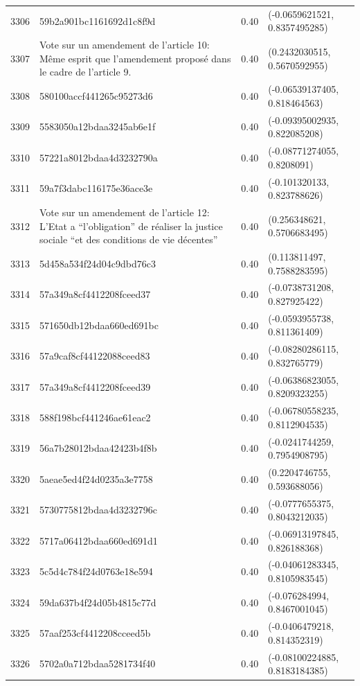 \begin{table}[ht]
\begin{tabular}{rlrl}
  3306 & 59b2a901bc1161692d1c8f9d & 0.40 & (-0.0659621521, 0.8357495285) \\ 
  3307 & Vote sur un amendement de l'article 10: Même esprit que l'amendement proposé dans le cadre de l'article 9. & 0.40 & (0.2432030515, 0.5670592955) \\ 
  3308 & 580100accf441265c95273d6 & 0.40 & (-0.06539137405, 0.818464563) \\ 
  3309 & 5583050a12bdaa3245ab6e1f & 0.40 & (-0.09395002935, 0.822085208) \\ 
  3310 & 57221a8012bdaa4d3232790a & 0.40 & (-0.08771274055, 0.8208091) \\ 
  3311 & 59a7f3dabc116175e36ace3e & 0.40 & (-0.101320133, 0.823788626) \\ 
  3312 & Vote sur un amendement de l'article 12: L’Etat a “l’obligation” de réaliser la justice sociale “et des conditions de vie décentes” & 0.40 & (0.256348621, 0.5706683495) \\ 
  3313 & 5d458a534f24d04c9dbd76c3 & 0.40 & (0.113811497, 0.7588283595) \\ 
  3314 & 57a349a8cf4412208fceed37 & 0.40 & (-0.0738731208, 0.827925422) \\ 
  3315 & 571650db12bdaa660ed691bc & 0.40 & (-0.0593955738, 0.811361409) \\ 
  3316 & 57a9caf8cf44122088ceed83 & 0.40 & (-0.08280286115, 0.832765779) \\ 
  3317 & 57a349a8cf4412208fceed39 & 0.40 & (-0.06386823055, 0.8209323255) \\ 
  3318 & 588f198bcf441246ae61eac2 & 0.40 & (-0.06780558235, 0.8112904535) \\ 
  3319 & 56a7b28012bdaa42423b4f8b & 0.40 & (-0.0241744259, 0.7954908795) \\ 
  3320 & 5aeae5ed4f24d0235a3e7758 & 0.40 & (0.2204746755, 0.593688056) \\ 
  3321 & 5730775812bdaa4d3232796c & 0.40 & (-0.0777655375, 0.8043212035) \\ 
  3322 & 5717a06412bdaa660ed691d1 & 0.40 & (-0.06913197845, 0.826188368) \\ 
  3323 & 5c5d4c784f24d0763e18e594 & 0.40 & (-0.04061283345, 0.8105983545) \\ 
  3324 & 59da637b4f24d05b4815c77d & 0.40 & (-0.076284994, 0.8467001045) \\ 
  3325 & 57aaf253cf4412208cceed5b & 0.40 & (-0.0406479218, 0.814352319) \\ 
  3326 & 5702a0a712bdaa5281734f40 & 0.40 & (-0.08100224885, 0.8183184385) \\ 

\end{tabular}
\end{table}
